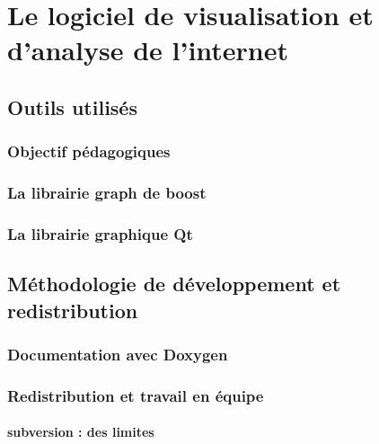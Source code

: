 \section{Le logiciel de visualisation et d'analyse de l'internet}
\subsection{Outils utilisés}
\subsubsection{Objectif pédagogiques}
\subsubsection{La librairie graph de boost}
\subsubsection{La librairie graphique Qt}

\subsection{Méthodologie de développement et redistribution}
\subsubsection{Documentation avec Doxygen}
\subsubsection{Redistribution et travail en équipe}
\paragraph{subversion : des limites}

